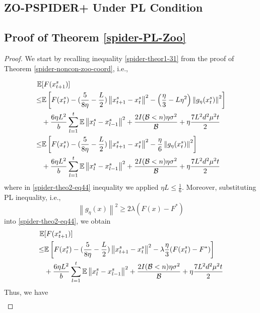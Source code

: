 \documentclass[iicol,sn-basic]{sn-jnl}
\theoremstyle{thmstyleone}%
\theoremstyle{thmstyletwo}%
\theoremstyle{thmstylethree}%
\newcommand*{\E}{\mathbb{E}}
\newcommand{\norm}[1]{\left\lVert#1\right\rVert}
\begin{document}
\subsection{ZO-PSPIDER+ Under PL Condition}

\noindent\subsection{Proof of Theorem \ref{spider-PL-Zoo}}

\begin{proof}
We start by recalling inequality \eqref{spider-theor1-31} from the proof of Theorem \ref{spider-noncon-zoo-coord}, i.e.,

 \begin{align} 
\E&[F({x}_{t+1}^s)] \notag
\notag
\\ \leq & \E\left[F({x}_{t}^s)  -(\frac{5}{8\eta} - \frac{L}{2})\norm{{x}_{t+1}^s-x_{t}^s}^2- \left(\frac{\eta}{3}-L\eta^2\right)\norm{g_{\eta}(x_{t}^s)}^2\right]\notag
\\&+\frac{6\eta L^2}{b}\sum_{l=1}^t\E\norm{x_{l}^s-{x}_{l-1}^{s}}^2 + \frac{2I(\mathcal{B} < n)\eta \sigma ^2}{\mathcal{B}}+\eta \frac{7L^2 d^2 \mu^2 t}{2} 
\\ \leq & \E\left[F({x}_{t}^s)  -(\frac{5}{8\eta} - \frac{L}{2})\norm{{x}_{t+1}^s-x_{t}^s}^2 - \frac{\eta}{6}\norm{g_{\eta}(x_{t}^s)}^2\right]\notag
\\&+\frac{6\eta L^2}{b}\sum_{l=1}^t\E\norm{x_{l}^s-{x}_{l-1}^{s}}^2 + \frac{2I(\mathcal{B} < n)\eta \sigma ^2}{\mathcal{B}}+\eta \frac{7L^2 d^2 \mu^2 t}{2}\label{spider-theo2-eq44}
 \end{align}
 where in \eqref{spider-theo2-eq44} inequality we applied $\eta L \leq \frac{1}{6}$.
Moreover, substituting PL inequality, i.e., 
\begin{equation}
\norm{g_{\eta}(x)}^2 \geq 2\lambda (F(x) - F^*)
\end{equation}
into \eqref{spider-theo2-eq44}, we obtain
\begin{align} 
\E&[F({x}_{t+1}^s)] \notag
\notag
\\ \leq & \E\left[F({x}_{t}^s)  -(\frac{5}{8\eta} - \frac{L}{2})\norm{{x}_{t+1}^s-x_{t}^s}^2 - \lambda\frac{\eta}{3}(F({x}_{t}^s) - F^*)\right]\notag
\\&+\frac{6\eta L^2}{b}\sum_{l=1}^t\E\norm{x_{l}^s-{x}_{l-1}^{s}}^2 + \frac{2I(\mathcal{B} < n)\eta \sigma ^2}{\mathcal{B}}+\eta \frac{7L^2 d^2 \mu^2 t}{2}
 \end{align}
Thus, we have
\begin{align} 

\end{align}
\end{proof}
\end{document}
